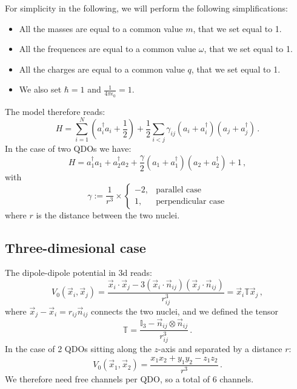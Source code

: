 \documentclass[reprint, amsmath, amssymb, aps]{revtex4-2}
\begin{document}
        For simplicity in the following, we will perform the following simplifications:
        \begin{itemize}
            \item All the masses are equal to a common value $m$, that we set equal to 1.
            \item All the frequences are equal to a common value $\omega$, that we set equal to 1.
            \item All the charges are equal to a common value $q$, that we set equal to 1.
            \item We also set $\hbar=1$ and $\tfrac{1}{4\pi\epsilon_0}=1$.
        \end{itemize}
        The model therefore reads:
        \begin{equation}
        \label{eq:hamiltonian_N_qdos}
            H = \sum_{i=1}^N\left(a_i^\dagger a_i+\frac{1}{2}\right) + \frac{1}{2}\sum_{i<j}\gamma_{ij}\left(a_i+a_i^\dagger\right)\left(a_j+a_j^\dagger\right)\,.
        \end{equation}
        In the case of two QDOs we have:
        \begin{equation}
            H = a_1^\dagger a_1 + a_2^\dagger a_2 + \frac{\gamma}{2}\left(a_1+a_1^\dagger\right)\left(a_2+a_2^\dagger\right) + 1\,,
        \end{equation}
        with
        \begin{equation}
            \gamma := \frac{1}{r^3}\times
            \begin{cases}
                -2, & \text{parallel case} \\
                1, & \text{perpendicular case}
            \end{cases}
        \end{equation}
        where $r$ is the distance between the two nuclei.

    \subsection{Three-dimesional case}

        The dipole-dipole potential in 3d reads:
        \begin{equation}
            V_0(\vec x_i, \vec x_j) = \frac{\vec x_i\cdot \vec x_j - 3 (\vec x_i\cdot \vec n_{ij})(\vec x_j\cdot \vec n_{ij})}{r_{ij}^3}=\vec x_i \mathbb T \vec x_j\,,
        \end{equation}
        where $\vec x_j - \vec x_i = r_{ij}\vec n_{ij}$ connects the two nuclei, and we defined the tensor
        \begin{equation}
            \mathbb T = \frac{\mathbb I_3 - \vec n_{ij}\otimes\vec n_{ij}}{r_{ij}^3}\,.
        \end{equation}
        In the case of 2 QDOs sitting along the $z$-axis and separated by a distance $r$:
        \begin{equation}
            V_0(\vec x_1, \vec x_2) = \frac{x_1x_2 + y_1y_2 - z_1z_2}{r^3}\,.
        \end{equation}
        We therefore need free channels per QDO, so a total of 6 channels.
\end{document}
